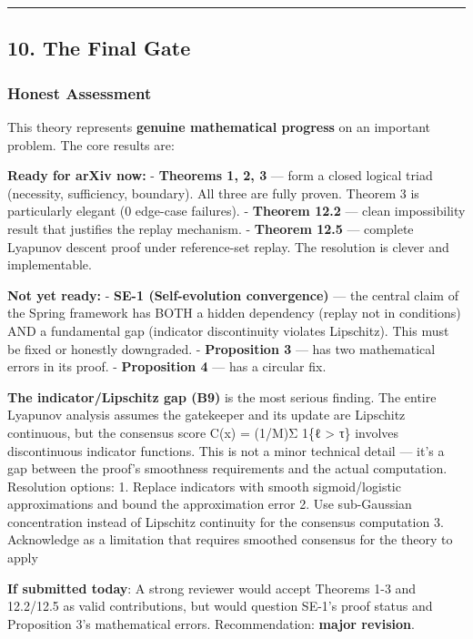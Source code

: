 \documentclass[
  12pt,
]{ctexart}
\begin{document}
\begin{center}\rule{0.5\linewidth}{0.5pt}\end{center}

\subsection{10. The Final Gate}\label{the-final-gate}

\subsubsection{Honest Assessment}\label{honest-assessment}

This theory represents \textbf{genuine mathematical progress} on an
important problem. The core results are:

\textbf{Ready for arXiv now:} - \textbf{Theorems 1, 2, 3} --- form a
closed logical triad (necessity, sufficiency, boundary). All three are
fully proven. Theorem 3 is particularly elegant (0 edge-case failures).
- \textbf{Theorem 12.2} --- clean impossibility result that justifies
the replay mechanism. - \textbf{Theorem 12.5} --- complete Lyapunov
descent proof under reference-set replay. The resolution is clever and
implementable.

\textbf{Not yet ready:} - \textbf{SE-1 (Self-evolution convergence)} ---
the central claim of the Spring framework has BOTH a hidden dependency
(replay not in conditions) AND a fundamental gap (indicator
discontinuity violates Lipschitz). This must be fixed or honestly
downgraded. - \textbf{Proposition 3} --- has two mathematical errors in
its proof. - \textbf{Proposition 4} --- has a circular fix.

\textbf{The indicator/Lipschitz gap (B9)} is the most serious finding.
The entire Lyapunov analysis assumes the gatekeeper and its update are
Lipschitz continuous, but the consensus score C(x) = (1/M)Σ 1\{ℓ
\textgreater{} τ\} involves discontinuous indicator functions. This is
not a minor technical detail --- it's a gap between the proof's
smoothness requirements and the actual computation. Resolution options:
1. Replace indicators with smooth sigmoid/logistic approximations and
bound the approximation error 2. Use sub-Gaussian concentration instead
of Lipschitz continuity for the consensus computation 3. Acknowledge as
a limitation that requires smoothed consensus for the theory to apply

\textbf{If submitted today}: A strong reviewer would accept Theorems 1-3
and 12.2/12.5 as valid contributions, but would question SE-1's proof
status and Proposition 3's mathematical errors. Recommendation:
\textbf{major revision}.
\end{document}
